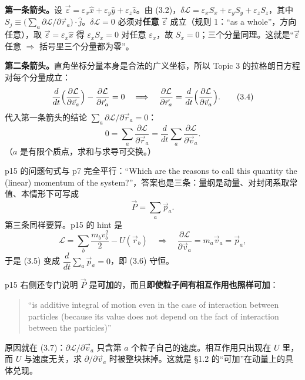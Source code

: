 \documentclass[11pt]{ctexart}
\begin{document}
\textbf{第一条箭头。}设 $\vec\varepsilon=\varepsilon_x\hat x+\varepsilon_y\hat y+\varepsilon_z\hat z$。由 (3.2)，$\delta\mathcal{L}=\varepsilon_xS_x+\varepsilon_yS_y+\varepsilon_zS_z$，其中 $S_j\equiv\bigl(\sum_a\partial\mathcal{L}/\partial\vec r_a\bigr)\cdot\hat j$。$\delta\mathcal{L}=0$ 必须对\textbf{任意} $\vec\varepsilon$ 成立（规则 1：“as a whole”，方向任意），取 $\vec\varepsilon=\varepsilon_x\hat x$ 得 $\varepsilon_xS_x=0$ 对任意 $\varepsilon_x$，故 $S_x=0$；三个分量同理。这就是“$\vec\varepsilon$ 任意 $\Rightarrow$ 括号里三个分量都为零”。

\textbf{第二条箭头。}直角坐标分量本身是合法的广义坐标，所以 Topic 3 的拉格朗日方程对每个分量成立：
\[
\frac{d}{dt}\Bigl(\frac{\partial\mathcal{L}}{\partial\vec v_a}\Bigr)-\frac{\partial\mathcal{L}}{\partial\vec r_a}=0
\quad\Longrightarrow\quad
\frac{\partial\mathcal{L}}{\partial\vec r_a}=\frac{d}{dt}\Bigl(\frac{\partial\mathcal{L}}{\partial\vec v_a}\Bigr). \tag{3.4}
\]
代入第一条箭头的结论 $\sum_a\partial\mathcal{L}/\partial\vec r_a=0$：
\[
0=\sum_a\frac{\partial\mathcal{L}}{\partial\vec r_a}=\frac{d}{dt}\sum_a\frac{\partial\mathcal{L}}{\partial\vec v_a}. \tag{3.5}
\]
（$a$ 是有限个质点，求和与求导可交换。）



p15 的问题句式与 p7 完全平行：“Which are the reasons to call this quantity the (linear) momentum of the system?”，答案也是三条：量纲是动量、对封闭系取常值、本情形下可写成
\[
\vec P=\sum_a\vec p_a . \tag{3.6}
\]
第三条同样要算。p15 的 hint 是
\[
\mathcal{L}=\sum_b\frac{m_bv_b^2}{2}-U(\vec r_b)
\quad\Longrightarrow\quad
\frac{\partial\mathcal{L}}{\partial\vec v_a}=m_a\vec v_a=\vec p_a , \tag{3.7}
\]
于是 (3.5) 变成 $\dfrac{d}{dt}\sum_a\vec p_a=0$，即 (3.6) 守恒。

p15 右侧还专门说明 $\vec P$ 是\textbf{可加}的，而且\textbf{即使粒子间有相互作用也照样可加}：
\begin{quote}
“is additive integral of motion even in the case of interaction between particles (because its value does not depend on the fact of interaction between the particles)”
\end{quote}
原因就在 (3.7)：$\partial\mathcal{L}/\partial\vec v_a$ 只含第 $a$ 个粒子自己的速度。相互作用只出现在 $U$ 里，而 $U$ 与速度无关，求 $\partial/\partial\vec v_a$ 时被整块抹掉。这就是 §1.2 的“可加”在动量上的具体兑现。
\end{document}
